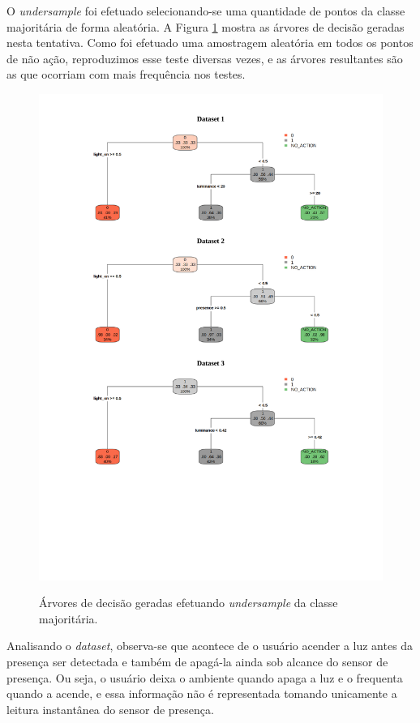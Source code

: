 O \textit{undersample} foi efetuado selecionando-se uma quantidade de pontos da classe majoritária de forma aleatória. A Figura \ref{fig:teste_4} mostra as árvores de decisão geradas nesta tentativa. Como foi efetuado uma amostragem aleatória em todos os pontos de não ação, reproduzimos esse teste diversas vezes, e as árvores resultantes são as que ocorriam com mais frequência nos testes.

\begin{figure}[hp]
	\centering
	\caption{Árvores de decisão geradas efetuando \textit{undersample} da classe majoritária.}
  \includegraphics[width=\textwidth]{imagens/teste_learning/4.pdf}
  \label{fig:teste_4}  
\end{figure}

Analisando o \textit{dataset}, observa-se que acontece de o usuário acender a luz antes da presença ser detectada e também de apagá-la ainda sob alcance do sensor de presença. Ou seja, o usuário deixa o ambiente quando apaga a luz e o frequenta quando a acende, e essa informação não é representada tomando unicamente a leitura instantânea do sensor de presença.

